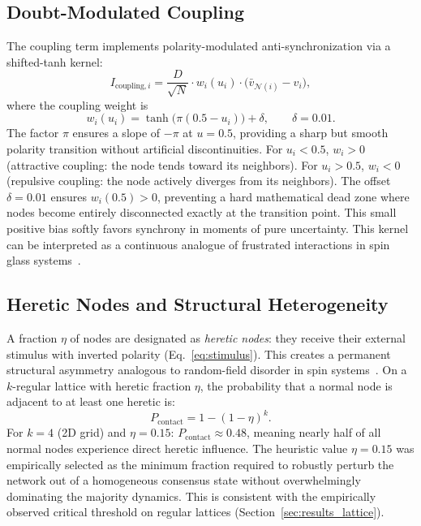 \documentclass[11pt]{article}
\begin{document}
\subsection{Doubt-Modulated Coupling}

The coupling term implements polarity-modulated anti-synchronization via a shifted-tanh kernel:
\begin{equation}
I_{\text{coupling},i} = \frac{D}{\sqrt{N}} \cdot w_i(u_i) \cdot \bigl(\bar{v}_{\mathcal{N}(i)} - v_i\bigr),
\label{eq:coupling}
\end{equation}
where the coupling weight is
\begin{equation}
w_i(u_i) = \tanh\bigl(\pi(0.5 - u_i)\bigr) + \delta, \qquad \delta = 0.01.
\label{eq:sigmoid}
\end{equation}
The factor $\pi$ ensures a slope of $-\pi$ at $u=0.5$, providing a sharp but smooth polarity transition without artificial discontinuities. For $u_i < 0.5$, $w_i > 0$ (attractive coupling: the node tends toward its neighbors). For $u_i > 0.5$, $w_i < 0$ (repulsive coupling: the node actively diverges from its neighbors). The offset $\delta = 0.01$ ensures $w_i(0.5) > 0$, preventing a hard mathematical dead zone where nodes become entirely disconnected exactly at the transition point. This small positive bias softly favors synchrony in moments of pure uncertainty. This kernel can be interpreted as a continuous analogue of frustrated interactions in spin glass systems~\cite{toulouse1977,odor2024}.

\subsection{Heretic Nodes and Structural Heterogeneity}

A fraction $\eta$ of nodes are designated as \textit{heretic nodes}: they receive their external stimulus with inverted polarity (Eq.~\ref{eq:stimulus}). This creates a permanent structural asymmetry analogous to random-field disorder in spin systems~\cite{nattermann1998}. On a $k$-regular lattice with heretic fraction $\eta$, the probability that a normal node is adjacent to at least one heretic is:
\begin{equation}
P_{\text{contact}} = 1 - (1-\eta)^k.
\label{eq:percolation}
\end{equation}
For $k=4$ (2D grid) and $\eta = 0.15$: $P_{\text{contact}} \approx 0.48$, meaning nearly half of all normal nodes experience direct heretic influence. The heuristic value $\eta = 0.15$ was empirically selected as the minimum fraction required to robustly perturb the network out of a homogeneous consensus state without overwhelmingly dominating the majority dynamics. This is consistent with the empirically observed critical threshold on regular lattices (Section~\ref{sec:results_lattice}).
\end{document}
